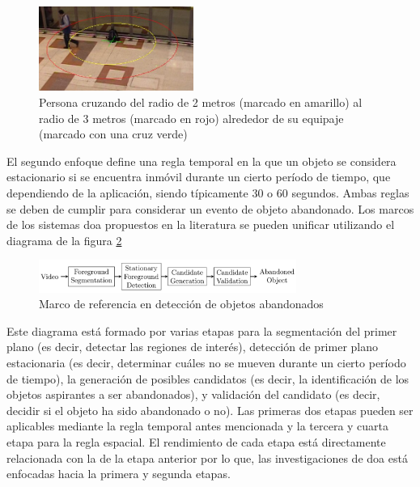 \begin{figure}[ht]
\centering
\includegraphics[width=0.45\textwidth]{img/chapters/introduccion/pets2006-3m.jpeg}
\caption{\label{fig:pets2006-3m}Persona cruzando del radio de 2 metros (marcado en amarillo) al radio de 3 metros (marcado en rojo) alrededor de su equipaje (marcado con una cruz verde) \cite{7789647}}
\end{figure}

El segundo enfoque define una regla temporal en la que un objeto se considera estacionario si se encuentra inmóvil durante un cierto período de tiempo, que dependiendo de la aplicación, siendo típicamente 30 o 60 segundos. Ambas reglas se deben de cumplir para considerar un evento de objeto abandonado. Los marcos de los sistemas \gls{doa} propuestos en la literatura se pueden unificar utilizando el diagrama de la figura \ref{fig:canonical-framework-aod}

\begin{figure}[ht]
\centering
\includegraphics[width=0.75\textwidth]{img/chapters/introduccion/canonical-framework-aod.png}
\caption{\label{fig:canonical-framework-aod}Marco de referencia en detección de objetos abandonados}
\end{figure}

Este diagrama está formado por varias etapas para la segmentación del primer plano (es decir, detectar las regiones de interés), detección de primer plano estacionaria (es decir, determinar cuáles no se mueven durante un cierto período de tiempo), la generación de posibles candidatos (es decir, la identificación de los objetos aspirantes a ser abandonados), y validación del candidato (es decir, decidir si el objeto ha sido abandonado o no). Las primeras dos etapas pueden ser aplicables mediante la regla temporal antes mencionada y la tercera y cuarta etapa para la regla espacial. El rendimiento de cada etapa está directamente relacionada con la de la etapa anterior por lo que, las investigaciones de \gls{doa} está enfocadas hacia la primera y segunda etapas.

